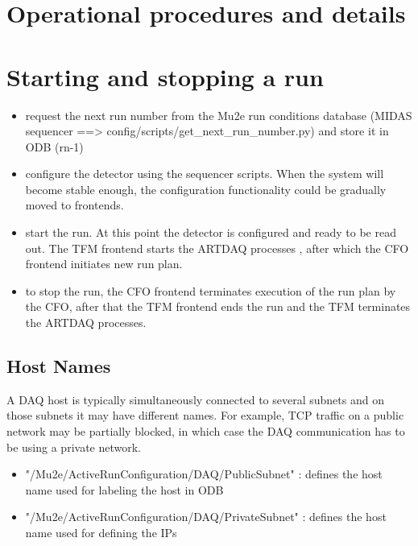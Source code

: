 \section{Operational procedures and details}

\section{Starting and stopping a run }

\begin{itemize}
\item
  request the next run number from the Mu2e run conditions database
  (MIDAS sequencer ==> config/scripts/get\_next\_run\_number.py) and store
  it in ODB (rn-1)
\item
  configure the detector using the sequencer scripts.
  When the system will become stable enough, the configuration functionality
  could be gradually moved to frontends.
\item
  start the run. At this point the detector is configured and ready to be read out.
  The TFM frontend starts the ARTDAQ processes , after which the CFO frontend 
  initiates new run plan.
\item
  to stop the run, the CFO frontend terminates execution of the run plan
  by the CFO, after that the TFM frontend ends the run and the TFM terminates
  the ARTDAQ processes.
\end{itemize}

\subsection{Host Names}

A DAQ host is typically simultaneously connected to several subnets and on
those subnets it may have different names.
For example, TCP traffic on a public network may be partially blocked,
in which case the DAQ communication has to be using a private network.

\begin{itemize}
\item
  "/Mu2e/ActiveRunConfiguration/DAQ/PublicSubnet"  :
  defines the host name used for labeling the host in ODB
\item
  "/Mu2e/ActiveRunConfiguration/DAQ/PrivateSubnet" :
  defines the host name used for defining the IPs
\end{itemize}

